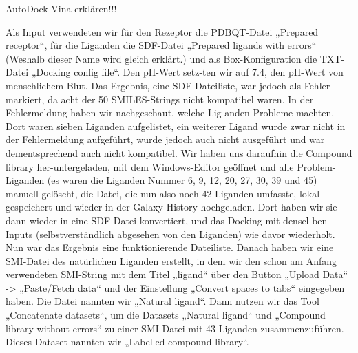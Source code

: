 \documentclass[11pt]{article}
\begin{document}
{    AutoDock Vina erklären!!!

    Als Input verwendeten wir für den Rezeptor die PDBQT-Datei „Prepared receptor“, für die Liganden die SDF-Datei „Prepared ligands with errors“ (Weshalb dieser Name wird gleich erklärt.) und als Box-Konfiguration die TXT-Datei „Docking config file“. Den pH-Wert setz-ten wir auf 7.4, den pH-Wert von menschlichem Blut.
    Das Ergebnis, eine SDF-Dateiliste, war jedoch als Fehler markiert, da acht der 50 SMILES-Strings nicht kompatibel waren. In der Fehlermeldung haben wir nachgeschaut, welche Lig-anden Probleme machten. Dort waren sieben Liganden aufgelistet, ein weiterer Ligand wurde zwar nicht in der Fehlermeldung aufgeführt, wurde jedoch auch nicht ausgeführt und war dementsprechend auch nicht kompatibel. Wir haben uns daraufhin die Compound library her-untergeladen, mit dem Windows-Editor geöffnet und alle Problem-Liganden (es waren die Liganden Nummer 6, 9, 12, 20, 27, 30, 39 und 45) manuell gelöscht, die Datei, die nun also noch 42 Liganden umfasste, lokal gespeichert und wieder in der Galaxy-History hochgeladen. Dort haben wir sie dann wieder in eine SDF-Datei konvertiert, und das Docking mit densel-ben Inputs (selbstverständlich abgesehen von den Liganden) wie davor wiederholt.
    Nun war das Ergebnis eine funktionierende Dateiliste.
    Danach haben wir eine SMI-Datei des natürlichen Liganden erstellt, in dem wir den schon am Anfang verwendeten SMI-String mit dem Titel „ligand“ über den Button „Upload Data“ -> „Paste/Fetch data“ und der Einstellung „Convert spaces to tabs“ eingegeben haben. Die Datei nannten wir „Natural ligand“.
    Dann nutzen wir das Tool „Concatenate datasets“, um die Datasets „Natural ligand“ und „Compound library without errors“ zu einer SMI-Datei mit 43 Liganden zusammenzuführen. Dieses Dataset nannten wir „Labelled compound library“.

}
\end{document}
